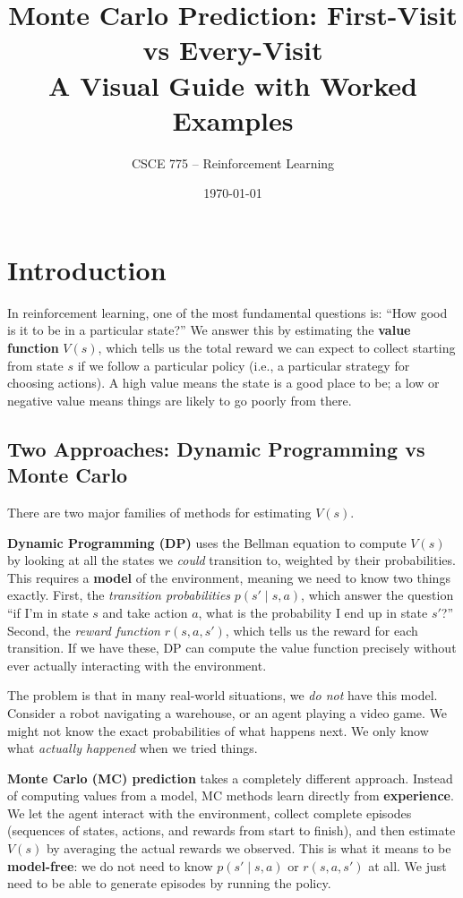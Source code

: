 \documentclass[journal, onecolumn]{IEEEtran}
\title{\textcolor{Garnet}{\textbf{Monte Carlo Prediction: First-Visit vs Every-Visit}}\\[0.3em]
\large A Visual Guide with Worked Examples}
\author{CSCE 775 -- Reinforcement Learning}
\date{\today}
\newcommand{\vocab}[1]{\textbf{\textcolor{Garnet}{#1}}}
\begin{document}
\maketitle

\section{Introduction}

In reinforcement learning, one of the most fundamental questions is: ``How good is it to be in a particular state?'' We answer this by estimating the \vocab{value function} $V(s)$, which tells us the total reward we can expect to collect starting from state $s$ if we follow a particular policy (i.e., a particular strategy for choosing actions). A high value means the state is a good place to be; a low or negative value means things are likely to go poorly from there.

\subsection{Two Approaches: Dynamic Programming vs Monte Carlo}

There are two major families of methods for estimating $V(s)$.

\vocab{Dynamic Programming (DP)} uses the Bellman equation to compute $V(s)$ by looking at all the states we \textit{could} transition to, weighted by their probabilities. This requires a \vocab{model} of the environment, meaning we need to know two things exactly. First, the \textit{transition probabilities} $p(s' \mid s, a)$, which answer the question ``if I'm in state $s$ and take action $a$, what is the probability I end up in state $s'$?'' Second, the \textit{reward function} $r(s, a, s')$, which tells us the reward for each transition. If we have these, DP can compute the value function precisely without ever actually interacting with the environment.

The problem is that in many real-world situations, we \textit{do not} have this model. Consider a robot navigating a warehouse, or an agent playing a video game. We might not know the exact probabilities of what happens next. We only know what \textit{actually happened} when we tried things.

\vocab{Monte Carlo (MC) prediction} takes a completely different approach. Instead of computing values from a model, MC methods learn directly from \vocab{experience}. We let the agent interact with the environment, collect complete episodes (sequences of states, actions, and rewards from start to finish), and then estimate $V(s)$ by averaging the actual rewards we observed. This is what it means to be \vocab{model-free}: we do not need to know $p(s' \mid s, a)$ or $r(s, a, s')$ at all. We just need to be able to generate episodes by running the policy.
\end{document}
